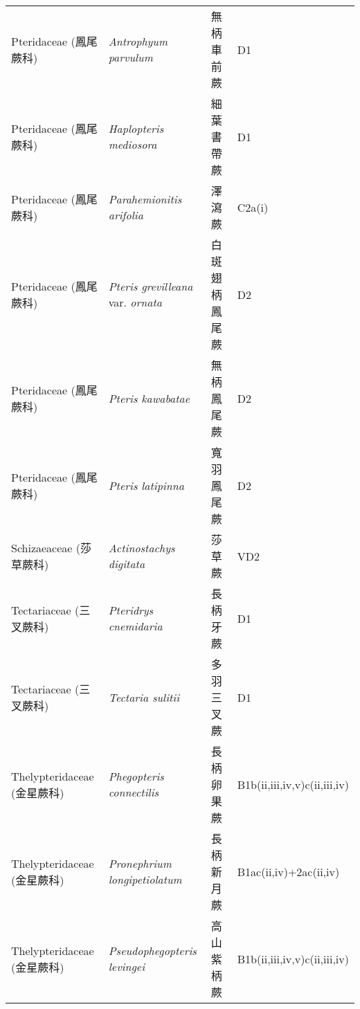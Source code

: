 \begin{longtable}{p{3cm}p{5cm}p{3cm}p{4cm}}
    Pteridaceae (鳳尾蕨科) & \textit{Antrophyum parvulum}  & 無柄車前蕨 & D1 \index{Antrophyum@\textit{Antrophyum}!parvulum@\textit{parvulum}}  \index{無柄車前蕨} \\
    Pteridaceae (鳳尾蕨科) & \textit{Haplopteris mediosora}  & 細葉書帶蕨 & D1 \index{Haplopteris@\textit{Haplopteris}!mediosora@\textit{mediosora}}  \index{細葉書帶蕨} \\
    Pteridaceae (鳳尾蕨科) & \textit{Parahemionitis arifolia}  & 澤瀉蕨 & C2a(i) \index{Parahemionitis@\textit{Parahemionitis}!arifolia@\textit{arifolia}}  \index{澤瀉蕨} \\
    Pteridaceae (鳳尾蕨科) & \textit{Pteris grevilleana} var. \textit{ornata}  & 白斑翅柄鳳尾蕨 & D2 \index{Pteris@\textit{Pteris}!grevilleana@\textit{grevilleana}!var. ornata@var. \textit{ornata}}  \index{白斑翅柄鳳尾蕨} \\
    Pteridaceae (鳳尾蕨科) & \textit{Pteris kawabatae}  & 無柄鳳尾蕨 & D2 \index{Pteris@\textit{Pteris}!kawabatae@\textit{kawabatae}}  \index{無柄鳳尾蕨} \\
    Pteridaceae (鳳尾蕨科) & \textit{Pteris latipinna}  & 寬羽鳳尾蕨 & D2 \index{Pteris@\textit{Pteris}!latipinna@\textit{latipinna}}  \index{寬羽鳳尾蕨} \\
    Schizaeaceae (莎草蕨科) & \textit{Actinostachys digitata}  & 莎草蕨 & VD2 \index{Actinostachys@\textit{Actinostachys}!digitata@\textit{digitata}}  \index{莎草蕨} \\
    Tectariaceae (三叉蕨科) & \textit{Pteridrys cnemidaria}  & 長柄牙蕨 & D1 \index{Pteridrys@\textit{Pteridrys}!cnemidaria@\textit{cnemidaria}}  \index{長柄牙蕨} \\
    Tectariaceae (三叉蕨科) & \textit{Tectaria sulitii}  & 多羽三叉蕨 & D1 \index{Tectaria@\textit{Tectaria}!sulitii@\textit{sulitii}}  \index{多羽三叉蕨} \\
    Thelypteridaceae (金星蕨科) & \textit{Phegopteris connectilis}  & 長柄卵果蕨 & B1b(ii,iii,iv,v)c(ii,iii,iv) \index{Phegopteris@\textit{Phegopteris}!connectilis@\textit{connectilis}}  \index{長柄卵果蕨} \\
    Thelypteridaceae (金星蕨科) & \textit{Pronephrium longipetiolatum}  & 長柄新月蕨 & B1ac(ii,iv)+2ac(ii,iv) \index{Pronephrium@\textit{Pronephrium}!longipetiolatum@\textit{longipetiolatum}}  \index{長柄新月蕨} \\
    Thelypteridaceae (金星蕨科) & \textit{Pseudophegopteris levingei}  & 高山紫柄蕨 & B1b(ii,iii,iv,v)c(ii,iii,iv) \index{Pseudophegopteris@\textit{Pseudophegopteris}!levingei@\textit{levingei}}  \index{高山紫柄蕨} \\
    \bottomrule
        \end{longtable}
